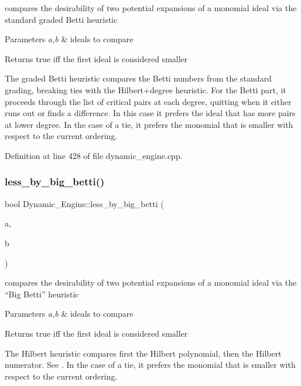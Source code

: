 compares the desirability of two potential expansions of a monomial ideal via the standard graded Betti heuristic 


\begin{DoxyParams}{Parameters}
{\em a,b} & ideals to compare \\
\hline
\end{DoxyParams}
\begin{DoxyReturn}{Returns}
{\ttfamily true} iff the first ideal is considered smaller
\end{DoxyReturn}
The graded Betti heuristic compares the Betti numbers from the standard grading, breaking ties with the Hilbert+degree heuristic. For the Betti part, it proceeds through the list of critical pairs at each degree, quitting when it either runs out or finds a difference. In this case it prefers the ideal that has more pairs at lower degree. In the case of a tie, it prefers the monomial that is smaller with respect to the current ordering. 

Definition at line 428 of file dynamic\+\_\+engine.\+cpp.

\mbox{\label{namespace_dynamic___engine_a083c09fdc98db92614d126a5cca19a24}} 
\subsubsection{\texorpdfstring{less\+\_\+by\+\_\+big\+\_\+betti()}{less\_by\_big\_betti()}}
{\footnotesize\ttfamily bool Dynamic\+\_\+\+Engine\+::less\+\_\+by\+\_\+big\+\_\+betti (\begin{DoxyParamCaption}\item[{\hyperlink{group___g_b_computation_class_dynamic___engine_1_1_p_p___with___ideal}{P\+P\+\_\+\+With\+\_\+\+Ideal} \&}]{a,  }\item[{\hyperlink{group___g_b_computation_class_dynamic___engine_1_1_p_p___with___ideal}{P\+P\+\_\+\+With\+\_\+\+Ideal} \&}]{b }\end{DoxyParamCaption})}



compares the desirability of two potential expansions of a monomial ideal via the ``Big Betti'' heuristic 


\begin{DoxyParams}{Parameters}
{\em a,b} & ideals to compare \\
\hline
\end{DoxyParams}
\begin{DoxyReturn}{Returns}
{\ttfamily true} iff the first ideal is considered smaller
\end{DoxyReturn}
The Hilbert heuristic compares first the Hilbert polynomial, then the Hilbert numerator. See \cite{CaboaraDynAlg}. In the case of a tie, it prefers the monomial that is smaller with respect to the current ordering. 

